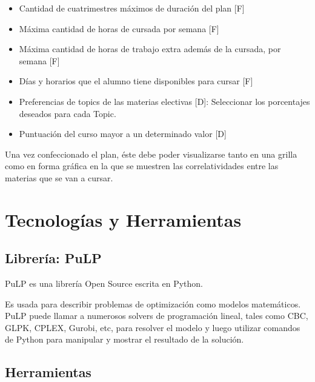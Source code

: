 \documentclass[a4paper]{article}
\begin{document}
\begin{itemize}
	\item Cantidad de cuatrimestres máximos de duración del plan [F]
	\item Máxima cantidad de horas de cursada por semana [F]
	\item Máxima cantidad de horas de trabajo extra además de la cursada, por semana [F]
	\item Días y horarios que el alumno tiene disponibles para cursar [F]
	\item Preferencias de topics de las materias electivas [D]: Seleccionar los porcentajes deseados para cada Topic.
	\item Puntuación del curso mayor a un determinado valor [D]	
\end{itemize}

Una vez confeccionado el plan, éste debe poder visualizarse tanto en una grilla como en forma gráfica en la que se muestren las correlatividades entre las materias que se van a cursar.

\section{Tecnologías y Herramientas}

\subsection{Librería: PuLP}

PuLP es una librería Open Source escrita en Python.

Es usada para describir problemas de optimización como modelos matemáticos. PuLP puede llamar a numerosos solvers de programación lineal, tales como CBC, GLPK, CPLEX, Gurobi, etc, para resolver el modelo y luego utilizar comandos de Python para manipular y mostrar el resultado de la solución.

\subsection{Herramientas}
\end{document}
